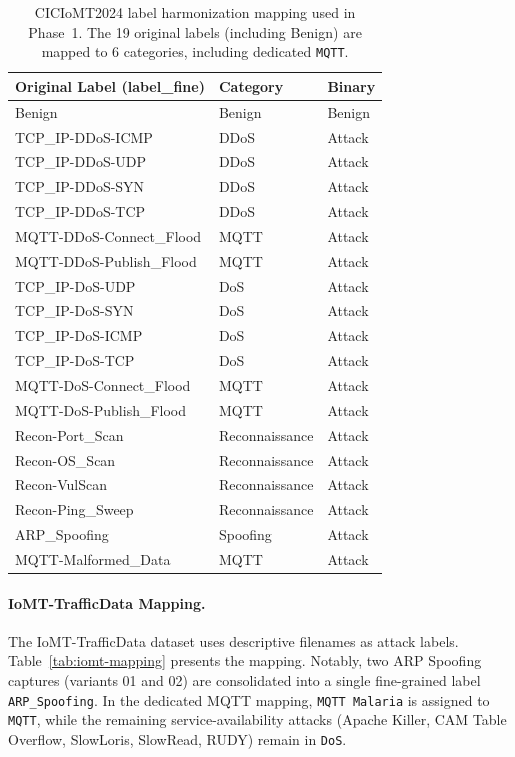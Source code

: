 \begin{table}[htbp]
\centering
\caption{CICIoMT2024 label harmonization mapping used in Phase~1. The 19 original labels (including Benign) are mapped to 6 categories, including dedicated \texttt{MQTT}.}
\label{tab:ciciomt-mapping}
\small
\begin{tabularx}{\textwidth}{@{}l l l@{}}
\toprule
\textbf{Original Label (label\_fine)} & \textbf{Category} & \textbf{Binary} \\
\midrule
Benign & Benign & Benign \\
\addlinespace
TCP\_IP-DDoS-ICMP & DDoS & Attack \\
TCP\_IP-DDoS-UDP & DDoS & Attack \\
TCP\_IP-DDoS-SYN & DDoS & Attack \\
TCP\_IP-DDoS-TCP & DDoS & Attack \\
MQTT-DDoS-Connect\_Flood & MQTT & Attack \\
MQTT-DDoS-Publish\_Flood & MQTT & Attack \\
\addlinespace
TCP\_IP-DoS-UDP & DoS & Attack \\
TCP\_IP-DoS-SYN & DoS & Attack \\
TCP\_IP-DoS-ICMP & DoS & Attack \\
TCP\_IP-DoS-TCP & DoS & Attack \\
MQTT-DoS-Connect\_Flood & MQTT & Attack \\
MQTT-DoS-Publish\_Flood & MQTT & Attack \\
\addlinespace
Recon-Port\_Scan & Reconnaissance & Attack \\
Recon-OS\_Scan & Reconnaissance & Attack \\
Recon-VulScan & Reconnaissance & Attack \\
Recon-Ping\_Sweep & Reconnaissance & Attack \\
\addlinespace
ARP\_Spoofing & Spoofing & Attack \\
\addlinespace
MQTT-Malformed\_Data & MQTT & Attack \\
\bottomrule
\end{tabularx}
\end{table}

\paragraph{IoMT-TrafficData Mapping.}
The IoMT-TrafficData dataset uses descriptive filenames as attack labels. Table~\ref{tab:iomt-mapping} presents the mapping. Notably, two ARP Spoofing captures (variants 01 and 02) are consolidated into a single fine-grained label \texttt{ARP\_Spoofing}. In the dedicated MQTT mapping, \texttt{MQTT Malaria} is assigned to \texttt{MQTT}, while the remaining service-availability attacks (Apache Killer, CAM Table Overflow, SlowLoris, SlowRead, RUDY) remain in \texttt{DoS}.

